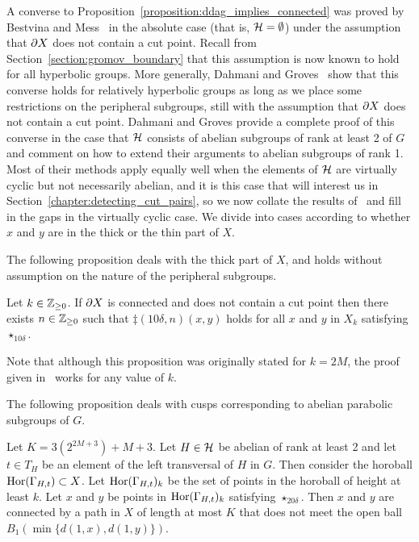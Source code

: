A converse to Proposition~\ref{proposition:ddag_implies_connected} was proved by Bestvina and Mess~\cite[Proposition 3.3]{bestvinamess91} in the absolute case (that is, $\mathcal{H} = \emptyset$) under the assumption that $\partial X$ does not contain a cut point. 
Recall from Section~\ref{section:gromov_boundary} that this assumption is now known to hold for all hyperbolic groups. 
More generally, Dahmani and Groves~\cite{dahmanigroves08a} show that this converse holds for relatively hyperbolic groups as long as we place some restrictions on the peripheral subgroups, still with the assumption that $\partial X$ does not contain a cut point.
Dahmani and Groves provide a complete proof of this converse in the case that $\mathcal{H}$ consists of abelian subgroups of rank at least 2 of $G$ and comment on how to extend their arguments to abelian subgroups of rank 1.
Most of their methods apply equally well when the elements of $\mathcal{H}$ are virtually cyclic but not necessarily abelian, and it is this case that will interest us in Section~\ref{chapter:detecting_cut_pairs}, so we now collate the results of~\cite{dahmanigroves08a} and fill in the gaps in the virtually cyclic case.
We divide into cases according to whether $x$ and $y$ are in the thick or the thin part of $X$.

The following proposition deals with the thick part of $X$, and holds without assumption on the nature of the peripheral subgroups.

\begin{proposition}\cite[Lemma 4.2]{dahmanigroves08a}
  \label{proposition:double_dagger_thick}
  Let $k \in \mathbb{Z}_{\geq0}$.
  If $\partial X$ is connected and does not contain a cut point then there exists $n \in \mathbb{Z}_{\geq 0}$ such that $\ddag(10\delta, n)(x, y)$ holds for all $x$ and $y$ in $X_k$ satisfying $\star_{10\delta}$.
\end{proposition}

Note that although this proposition was originally stated for $k = 2M$, the proof given in~\cite{dahmanigroves08a} works for any value of $k$.

The following proposition deals with cusps corresponding to abelian parabolic subgroups of $G$. 

\begin{proposition}\cite[Lemma 2.16]{dahmanigroves08a}
  \label{proposition:double_dagger_thin_rank_2}
  Let $K = 3(2^{2M + 3}) + M + 3$. 
  Let $H \in \mathcal{H}$ be abelian of rank at least 2 and let $t \in T_H$ be an element of the left transversal of $H$ in $G$.
  Then consider the horoball $\operatorname{Hor}(\Gamma_{H,t}) \subset X$.
  Let $\operatorname{Hor}(\Gamma_{H,t})_k$ be the set of points in the horoball of height at least $k$.
  Let $x$ and $y$ be points in $\operatorname{Hor}(\Gamma_{H,t})_k$ satisfying $\star_{20\delta}$.
  Then $x$ and $y$ are connected by a path in $X$ of length at most $K$ that does not meet the open ball $B_1(\min\{d(1, x), d(1, y)\})$.
\end{proposition}


